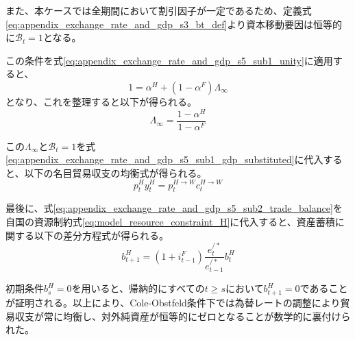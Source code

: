 また、本ケースでは全期間において割引因子が一定であるため、定義式\eqref{eq:appendix_exchange_rate_and_gdp_s3_bt_def}より資本移動要因は恒等的に\(\mathcal{B}_t=1\)となる。

この条件を式\eqref{eq:appendix_exchange_rate_and_gdp_s5_sub1_unity}に適用すると、
\begin{equation}
    1=\alpha^H+(1-\alpha^F)\Lambda_{\infty}
    \label{eq:appendix_exchange_rate_and_gdp_s5_sub2_unity_subst}
\end{equation}
となり、これを整理すると以下が得られる。
\begin{equation}
    \Lambda_{\infty}=\frac{1-\alpha^H}{1-\alpha^F}
    \label{eq:appendix_exchange_rate_and_gdp_s5_sub2_lambda_ss}
\end{equation}

この\(\Lambda_{\infty}\)と\(\mathcal{B}_t=1\)を式\eqref{eq:appendix_exchange_rate_and_gdp_s5_sub1_gdp_substituted}に代入すると、以下の名目貿易収支の均衡式が得られる。
\begin{equation}
    p_t^Hy_t^H=p_t^{H\to W}c_t^{H\to W}
    \label{eq:appendix_exchange_rate_and_gdp_s5_sub2_trade_balance}
\end{equation}

最後に、式\eqref{eq:appendix_exchange_rate_and_gdp_s5_sub2_trade_balance}を自国の資源制約式\eqref{eq:model_resource_constraint_H}に代入すると、資産蓄積に関する以下の差分方程式が得られる。
\begin{equation}
    b_{t+1}^H=(1+i_{t-1}^F)\frac{e_t^{/*}}{e_{t-1}^{/*}}b_t^H
    \label{eq:appendix_exchange_rate_and_gdp_s5_sub2_nfa_diff}
\end{equation}

初期条件\(b_s^H=0\)を用いると、帰納的にすべての\(t\ge s\)において\(b_{t+1}^H=0\)であることが証明される。以上により、Cole-Obstfeld条件下では為替レートの調整により貿易収支が常に均衡し、対外純資産が恒等的にゼロとなることが数学的に裏付けられた。